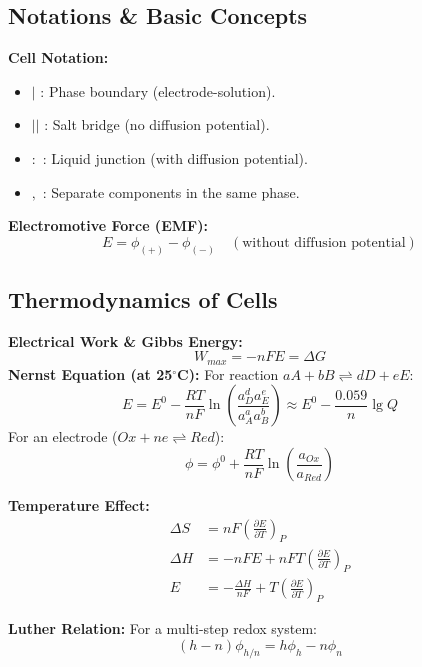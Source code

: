 \subsection{Notations \& Basic Concepts}
\textbf{Cell Notation:}
\begin{itemize}
    \item $|$ : Phase boundary (electrode-solution).
    \item $||$ : Salt bridge (no diffusion potential).
    \item $:$ : Liquid junction (with diffusion potential).
    \item $,$ : Separate components in the same phase.
\end{itemize}
\textbf{Electromotive Force (EMF):}
\begin{equation}
    E = \phi_{(+)} - \phi_{(-)} \quad (\text{without diffusion potential})
\end{equation}

\subsection{Thermodynamics of Cells}
\textbf{Electrical Work \& Gibbs Energy:}
\begin{equation}
    W_{max} = -nFE = \Delta G
\end{equation}
\textbf{Nernst Equation (at 25$^{\circ}$C):}
For reaction $aA + bB \rightleftharpoons dD + eE$:
\begin{equation}
    E = E^0 - \frac{RT}{nF} \ln \left( \frac{a_D^d a_E^e}{a_A^a a_B^b} \right) \approx E^0 - \frac{0.059}{n} \lg Q
\end{equation}
For an electrode ($Ox + ne \rightleftharpoons Red$):
\begin{equation}
    \phi = \phi^0 + \frac{RT}{nF} \ln \left( \frac{a_{Ox}}{a_{Red}} \right)
\end{equation}

\textbf{Temperature Effect:}
\begin{align}
    \Delta S &= nF \left( \frac{\partial E}{\partial T} \right)_P \\
    \Delta H &= -nFE + nFT \left( \frac{\partial E}{\partial T} \right)_P \\
    E &= -\frac{\Delta H}{nF} + T \left( \frac{\partial E}{\partial T} \right)_P
\end{align}

\textbf{Luther Relation:} For a multi-step redox system:
\begin{equation}
    (h-n)\phi_{h/n} = h\phi_h - n\phi_n
\end{equation}

